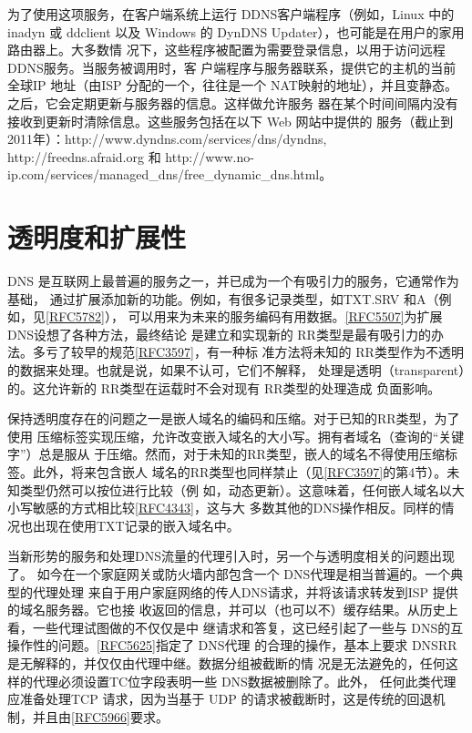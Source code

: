 为了使用这项服务，在客户端系统上运行 DDNS客户端程序（例如，Linux 中的 inadyn
或 ddclient 以及 Windows 的 DynDNS Updater），也可能是在用户的家用路由器上。大多数情
况下，这些程序被配置为需要登录信息，以用于访问远程DDNS服务。当服务被调用时，客
户端程序与服务器联系，提供它的主机的当前全球IP 地址（由ISP 分配的一个，往往是一个
NAT映射的地址），并且变静态。之后，它会定期更新与服务器的信息。这样做允许服务
器在某个时间间隔内没有接收到更新时清除信息。这些服务包括在以下 Web 网站中提供的
服务（截止到2011年）：http://www.dyndns.com/services/dns/dyndns, http://freedns.afraid.org
和 http://www.no-ip.com/services/managed\_dns/free\_dynamic\_dns.html。

\section{透明度和扩展性}

DNS 是互联网上最普遍的服务之一，并已成为一个有吸引力的服务，它通常作为基础，
通过扩展添加新的功能。例如，有很多记录类型，如TXT.SRV 和A（例如，见\href{https://www.rfc-editor.org/rfc/rfc5782}{[RFC5782]}），
可以用来为未来的服务编码有用数据。\href{https://www.rfc-editor.org/rfc/rfc5507}{[RFC5507]}为扩展 DNS设想了各种方法，最终结论
是建立和实现新的 RR类型是最有吸引力的办法。多亏了较早的规范\href{https://www.rfc-editor.org/rfc/rfc3597}{[RFC3597]}，有一种标
准方法将未知的 RR类型作为不透明的数据来处理。也就是说，如果不认可，它们不解释，
处理是透明（transparent）的。这允许新的 RR类型在运载时不会对现有 RR类型的处理造成
负面影响。

保持透明度存在的问题之一是嵌人域名的编码和压缩。对于已知的RR类型，为了使用
压缩标签实现压缩，允许改变嵌入域名的大小写。拥有者域名（查询的“关键字”）总是服从
于压缩。然而，对于未知的RR类型，嵌人的域名不得使用压缩标签。此外，将来包含嵌人
域名的RR类型也同样禁止（见\href{https://www.rfc-editor.org/rfc/rfc3597}{[RFC3597]}的第4节）。未知类型仍然可以按位进行比较（例
如，动态更新）。这意味着，任何嵌人域名以大小写敏感的方式相比较\href{https://www.rfc-editor.org/rfc/rfc4343}{[RFC4343]}，这与大
多数其他的DNS操作相反。同样的情况也出现在使用TXT记录的嵌入域名中。

当新形势的服务和处理DNS流量的代理引入时，另一个与透明度相关的问题出现了。
如今在一个家庭网关或防火墙内部包含一个 DNS代理是相当普遍的。一个典型的代理处理
来自于用户家庭网络的传人DNS请求，并将该请求转发到ISP 提供的域名服务器。它也接
收返回的信息，并可以（也可以不）缓存结果。从历史上看，一些代理试图做的不仅仅是中
继请求和答复，这已经引起了一些与 DNS的互操作性的问题。\href{https://www.rfc-editor.org/rfc/rfc5625}{[RFC5625]}指定了 DNS代理
的合理的操作，基本上要求 DNSRR 是无解释的，并仅仅由代理中继。数据分组被截断的情
况是无法避免的，任何这样的代理必须设置TC位字段表明一些 DNS数据被删除了。此外，
任何此类代理应准备处理TCP 请求，因为当基于 UDP 的请求被截断时，这是传统的回退机
制，并且由\href{https://www.rfc-editor.org/rfc/rfc5966}{[RFC5966]}要求。

